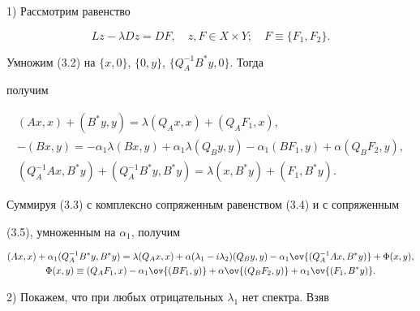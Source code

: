  


\begin{pf} 


1) Рассмотрим равенство 


\begin{equation} 


L z-\lambda D z=D F,\quad z,F\in X\times Y;\quad 


F\equiv\{F_1,F_2\}. 


\end{equation} 


Умножим (3.2) на $\{x,0\}$, $\{0,y\}$, $\{Q^{-1}_A B^*y,0\}$. Тогда 


получим 


\begin{gather} 


(Ax,x)+(B^*y,y)=\lambda(Q_A x,x)+(Q_A F_1,x),\\ 


% 


-(B x,y)=-\alpha_1\lambda(B x,y)+\alpha_1\lambda(Q_B y,y)- 


\alpha_1(B F_1,y)+\alpha(Q_B F_2,y), \\ 


% 


(Q^{-1}_A Ax,B^*y)+(Q^{-1}_A B^*y,B^*y)=\lambda 


(x,B^*y)+(F_1,B^*y). 


\end{gather} 


Суммируя (3.3) с комплексно сопряженным равенством (3.4) и с сопряженным 


(3.5), умноженным на $\alpha_1$, получим 


\begin{gather} 


(Ax,x)+\alpha_1(Q^{-1}_A B^*y,B^*y)=\lambda 


(Q_A x,x)+\alpha(\lambda_1-i\lambda_2) 


(Q_B y,y)-\alpha_1\ov{(Q^{-1}_A Ax,B^*y)}+\Phi(x,y),\\ 


% 


\Phi(x,y)\equiv(Q_A F_1,x)-\alpha_1\ov{(B F_1,y)}+\alpha 


\ov{(Q_B F_2,y)}+\alpha_1\ov{(F_1,B^*y)}.\notag 


\end{gather} 


 


2) Покажем, что при любых отрицательных $\lambda_1$ нет спектра. Взяв 



\end{pf}
